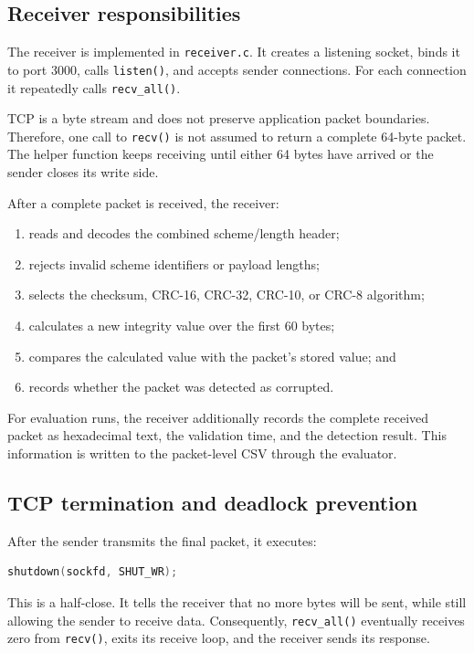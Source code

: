 \documentclass[12pt,a4paper]{article}
\begin{document}
\subsection{Receiver responsibilities}

The receiver is implemented in \texttt{receiver.c}. It creates a listening
socket, binds it to port 3000, calls \texttt{listen()}, and accepts sender
connections. For each connection it repeatedly calls \texttt{recv\_all()}.

TCP is a byte stream and does not preserve application packet boundaries.
Therefore, one call to \texttt{recv()} is not assumed to return a complete
64-byte packet. The helper function keeps receiving until either 64 bytes
have arrived or the sender closes its write side.

After a complete packet is received, the receiver:

\begin{enumerate}
  \item reads and decodes the combined scheme/length header;
  \item rejects invalid scheme identifiers or payload lengths;
  \item selects the checksum, CRC-16, CRC-32, CRC-10, or CRC-8 algorithm;
  \item calculates a new integrity value over the first 60 bytes;
  \item compares the calculated value with the packet's stored value; and
  \item records whether the packet was detected as corrupted.
\end{enumerate}

For evaluation runs, the receiver additionally records the complete received
packet as hexadecimal text, the validation time, and the detection result.
This information is written to the packet-level CSV through the evaluator.

\subsection{TCP termination and deadlock prevention}

After the sender transmits the final packet, it executes:

\begin{lstlisting}[language=C]
shutdown(sockfd, SHUT_WR);
\end{lstlisting}

This is a half-close. It tells the receiver that no more bytes will be sent,
while still allowing the sender to receive data. Consequently,
\texttt{recv\_all()} eventually receives zero from \texttt{recv()}, exits its
receive loop, and the receiver sends its response.
\end{document}
